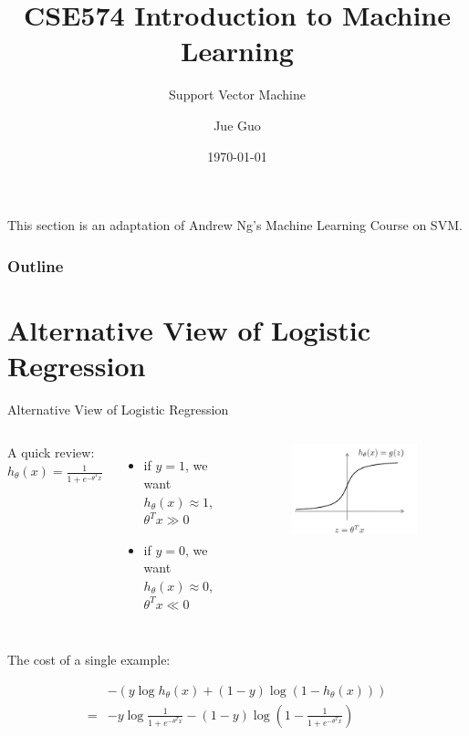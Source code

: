 \documentclass[9pt,dvipsnames]{beamer}
\title{CSE574 Introduction to Machine Learning}
\subtitle{Support Vector Machine}
\author{Jue Guo}
\institute{University at Buffalo}
\date{\today}
\begin{document}
\begin{frame}
	\titlepage
\end{frame}

\begin{frame}
	This section is an adaptation of Andrew Ng's Machine Learning Course on SVM.
\end{frame}

\begin{frame}
	\frametitle{Outline}
	\tableofcontents
\end{frame}



\section{Alternative View of Logistic Regression}
\begin{frame}{Alternative View of Logistic Regression}
	\begin{columns}
		A quick review: $h_\theta(x)=\frac{1}{1+e^{-\theta^T x}}$
		\begin{itemize}
			\item if \(y=1\), we want $h_\theta(x) \approx 1$, $\theta^T x \gg 0$
			\item if \(y=0\), we want \(h_\theta(x) \approx 0\), $\theta^T x \ll 0$
		\end{itemize}
		\begin{figure}
			\centering
			\includegraphics[width=0.9\textwidth]{imgs/svm_1.png}
		\end{figure}

	\end{columns}
	The cost of a single example:

	\begin{align*}
		  & -\left(y \log h_\theta(x)+(1-y) \log \left(1-h_\theta(x)\right)\right)                    \\
		= & -y \log \frac{1}{1+e^{-\theta^T x}}-(1-y) \log \left(1-\frac{1}{1+e^{-\theta^T x}}\right)
	\end{align*}
\end{frame}
\end{document}
